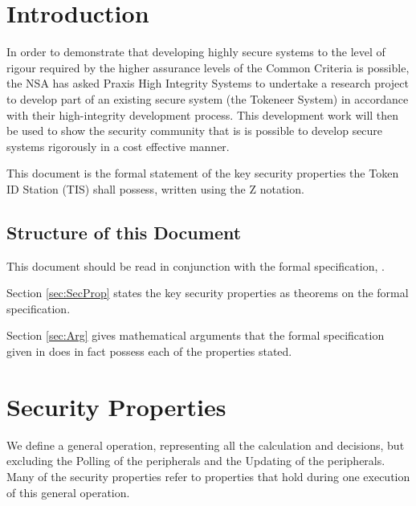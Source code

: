 \chapter{Introduction}
In order to demonstrate that developing highly secure systems to the
level of rigour required by the higher assurance levels of the Common
Criteria is possible, the NSA has asked Praxis High Integrity Systems to
undertake a research project to develop part of an existing secure
system (the Tokeneer System) in accordance with their high-integrity
development process. This development work will then be used to
show the security community that is is possible to develop secure
systems rigorously in a cost effective manner.

This document is the formal statement of the key security properties
the Token ID Station (TIS) shall possess,
written using the Z notation.

\section{Structure of this Document}
This document should be read in conjunction with the formal specification,
\cite{FS}.

Section \ref{sec:SecProp} states the key security properties as theorems
on the formal specification.

Section \ref{sec:Arg} gives mathematical arguments that the formal specification
given in \cite{FS} does in fact possess each of the properties stated.

\chapter{Security Properties}
\label{chap:SecProp}
\def\The{the~}%
We define a general operation, 
representing all the calculation and decisions,
but excluding the Polling of the peripherals and the Updating of the peripherals.
Many of the security properties refer to properties that hold during one execution of this
general operation.

